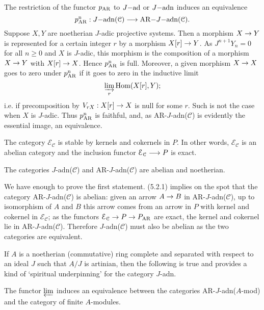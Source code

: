 \documentclass[deligne.tex]{subfiles}
\begin{document}
The restriction of the functor $p_{\mathrm{AR}}$ to $J\mathrm{-ad}$ or $J\mathrm{-adn}$ induces
an equivalence
\begin{equation*}
	p_{\mathrm{AR}}^\mathrm{n}:J\mathrm{-adn}(\mathcal C)\longrightarrow\mathrm{AR-}J\mathrm{-adn}(\mathcal C).
\end{equation*}
Suppose $X,Y$ are noetherian $J$-adic projective systems. Then a morphism
$X\rightarrow Y$ is represented for a certain integer $r$ by a morphism
$X[r]\rightarrow Y$. As $J^{n+1}Y_n=0$ for all $n\geq0$ and $X$ is $J$-adic,
this morphism is the composition of a morphism $X\rightarrow Y$ with $X[r]\rightarrow X$.
Hence $p_{\mathrm{AR}}^\mathrm{n}$ is full. Moreover, a given morphism $X\rightarrow X$ goes to zero
under $p_{\mathrm{AR}}^\mathrm{n}$ if it goes to zero in the inductive limit
\begin{equation*}
	\varinjlim_r\operatorname{Hom}(X[r],Y);
\end{equation*}
i.e. if precomposition by $V_{rX}:X[r]\rightarrow X$ is null for some $r$.
Such is not the case when $X$ is $J$-adic. Thus $p_{\mathrm{AR}}^\mathrm{n}$ is faithful, and, 
as AR-$J$-adn($\mathcal C$) is evidently the essential image, an 
equivalence.
\begin{proposition*}[5.2.1]
	The category $\mathcal E_{\mathcal C}$ is stable by kernels and
	cokernels in $P$. In other words, $\mathcal E_{\mathcal C}$ is an
	abelian category and the inclusion functor
	$\mathcal E_{\mathcal C}\longrightarrow P$ is exact.
\end{proposition*}
\begin{theorem*}[5.2.3]
	The categories $J$-adn($\mathcal C$) and AR-$J$-adn($\mathcal C$) are
	abelian and noetherian.
\end{theorem*}
We have enough to prove the first statement.
(5.2.1) implies on the spot that the category
AR-$J$-adn($\mathcal C$) is abelian: given an arrow $A\rightarrow B$ in
AR-$J$-adn($\mathcal C$), up to isomorphism of $A$ and $B$ this arrow comes
from an arrow in $P$ with kernel and cokernel in $\mathcal E_{\mathcal C}$;
as the functors $\mathcal E_{\mathcal C}\rightarrow P\rightarrow P_{\mathrm{AR}}$ are exact, the kernel
and cokernel lie in AR-$J$-adn($\mathcal C$).
Therefore $J$-adn($\mathcal C$) must also be abelian as the two categories
are equivalent.
\begin{remark}
	If $A$ is a noetherian (commutative) ring complete and separated with
	respect to an ideal $J$ such that $A/J$ is artinian, then the following
	is true and provides a kind of `spiritual underpinning' for the
	category $J$-adn.
	\begin{proposition*}
		The functor $\varprojlim$ induces an equivalence
		between the categories \textup{AR-$J$-adn($A$-mod)} and the
		category of finite $A$-modules.
	\end{proposition*}
\end{remark}
\end{document}
